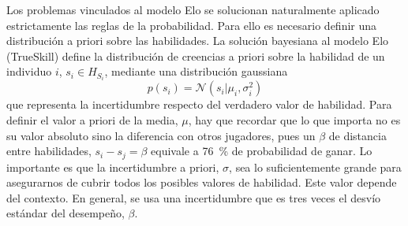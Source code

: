 \documentclass[a4paper,11pt]{book}
\newcommand{\N}{\mathcal{N}}
\theoremstyle{definition}
\begin{document}
Los problemas vinculados al modelo Elo se solucionan naturalmente aplicado estrictamente las reglas de la probabilidad.
%
Para ello es necesario definir una distribución a priori sobre las habilidades.
%
La soluci\'on bayesiana al modelo Elo (TrueSkill) define la distribuci\'on de creencias a priori sobre la habilidad de un individuo $i$, $s_i \in H_{S_i}$, mediante una distribuci\'on gaussiana
%
\begin{equation}
p(s_i) = \N(s_i | \mu_i, \sigma_i^2)
\end{equation}
%
que representa la incertidumbre respecto del verdadero valor de habilidad.
%
Para definir el valor a priori de la media, $\mu$, hay que recordar que lo que importa no es su valor absoluto sino la diferencia con otros jugadores, pues un $\beta$ de distancia entre habilidades, $s_i-s_j=\beta$ equivale a \SI{76}{\percent} de probabilidad de ganar.
%
Lo importante es que la incertidumbre a priori, $\sigma$, sea lo suficientemente grande para asegurarnos de cubrir todos los posibles valores de habilidad.
%
Este valor depende del contexto.
%
En general, se usa una incertidumbre que es tres veces el desv\'io est\'andar del desempe\~no, $\beta$.

\end{document}
